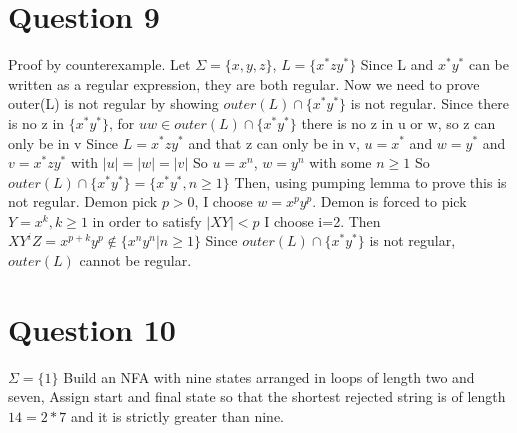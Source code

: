 \documentclass[a4paper, 11pt]{article}
\begin{document}
\section*{Question 9}

Proof by counterexample. Let $\Sigma = \{x,y,z\} $, $L = \{x^*zy^*\}$ Since L and ${x^*y^*}$ can be written as a regular expression, they are both regular. Now we need to prove outer(L) is not regular by showing $outer(L)\cap{\{x^*y^*\}}$ is not regular. 
Since there is no z in $\{x^*y^*\}$, for $uw\in{outer(L)\cap{\{x^*y^*\}}}$ there is no z in u or w, so z can only be in v
Since $L={x^*zy^*}$ and that z can only be in v, $u=x^*$ and $w=y^*$ and $v=x^*zy^*$ with $|u|=|w|=|v|$
So $u=x^n$, $w=y^n$ with some $n\geq{1}$
So $outer(L)\cap{\{x^*y^*\}} = \{x^*y^*,n\geq{1}\}$ 
Then, using pumping lemma to prove this is not regular.
Demon pick $p>0$, I choose $w=x^py^p$. Demon is forced to pick $ Y = x^k, k\geq1$ in order to satisfy $|XY| < p$ I choose i=2. Then $XY^iZ=x^{p+k}y^p\notin{\{x^ny^n | n\geq1\}}$
Since $outer(L)\cap{\{x^*y^*\}}$ is not regular, $outer(L)$ cannot be regular.


\section*{Question 10}
$\Sigma=\{1\}$
Build an NFA with nine states arranged in loops of length two and seven, Assign start and final state so that the shortest rejected string is of length $14 = 2 * 7$ and it is strictly greater than nine.


\end{document}
